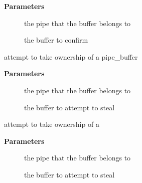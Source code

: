 \documentclass[a4paper,8pt,english]{sphinxmanual}
\begin{document}
\textbf{Parameters}
\begin{description}
\item[{}] \leavevmode
the pipe that the buffer belongs to

\item[{}] \leavevmode
the buffer to confirm

\end{description}

\begin{fulllineitems}
\label{filesystems/index:c.pipe_buf_steal}
attempt to take ownership of a pipe\_buffer

\end{fulllineitems}


\textbf{Parameters}
\begin{description}
\item[{}] \leavevmode
the pipe that the buffer belongs to

\item[{}] \leavevmode
the buffer to attempt to steal

\end{description}

\begin{fulllineitems}
\label{filesystems/index:c.generic_pipe_buf_steal}
attempt to take ownership of a {\hyperref[filesystems/index:c.pipe_buffer]{\emph{}}}

\end{fulllineitems}


\textbf{Parameters}
\begin{description}
\item[{}] \leavevmode
the pipe that the buffer belongs to

\item[{}] \leavevmode
the buffer to attempt to steal

\end{description}
\end{document}
